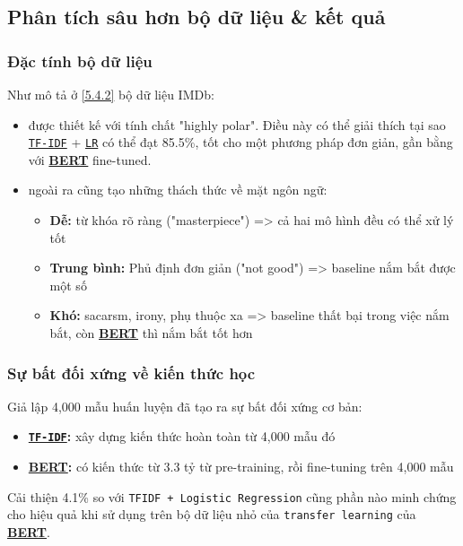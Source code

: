 \subsection{Phân tích sâu hơn bộ dữ liệu \& kết quả}
\label{ssec:phan_tich_chuyen_sau}

\subsubsection{Đặc tính bộ dữ liệu}

Như mô tả ở \ref{5.4.2} bộ dữ liệu IMDb:
\begin{itemize}
    \item được thiết kế với tính chất "highly polar". Điều này có thể giải thích tại sao \hyperref[acro:tfidf]{\texttt{TF-IDF}} + \hyperref[acro:lr]{\texttt{LR}} có thể đạt 85.5\%, tốt cho  một phương pháp đơn giản, gần bằng với \hyperref[acro:bert]{\textbf{BERT}} fine-tuned.

    \item ngoài ra cũng tạo những thách thức về mặt ngôn ngữ:
    \begin{itemize}
        \item \textbf{Dễ:} từ khóa rõ ràng ("masterpiece") => cả hai mô hình đều có thể xử lý tốt
        \item \textbf{Trung bình:} Phủ định đơn giản ("not good") => baseline nắm bắt được một số
        \item \textbf{Khó:} sacarsm, irony, phụ thuộc xa => baseline thất bại trong việc nắm bắt, còn \hyperref[acro:bert]{\textbf{BERT}} thì nắm bắt tốt hơn
    \end{itemize}
\end{itemize}

\subsubsection{Sự bất đối xứng về kiến thức học}
Giả lập 4,000 mẫu huấn luyện đã tạo ra sự bất đối xứng cơ bản:
\begin{itemize}
    \item \textbf{\hyperref[acro:tfidf]{\texttt{TF-IDF}}:} xây dựng kiến thức hoàn toàn từ 4,000 mẫu đó
    \item \textbf{\hyperref[acro:bert]{\textbf{BERT}}:} có kiến thức từ 3.3 tỷ từ pre-training, rồi fine-tuning trên 4,000 mẫu
\end{itemize}

Cải thiện 4.1\% so với \texttt{TFIDF + Logistic Regression} cũng phần nào minh chứng cho hiệu quả khi sử dụng trên bộ dữ liệu nhỏ của \texttt{transfer learning} của \hyperref[acro:bert]{\textbf{BERT}}.

